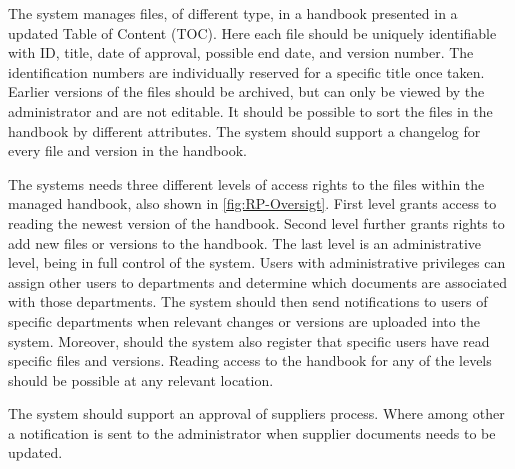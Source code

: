 The system manages files, of different type, in a handbook presented in a updated Table of Content (TOC).
Here each file should be uniquely identifiable with ID, title, date of approval, possible end date, and version number.
The identification numbers are individually reserved for a specific title once taken.
Earlier versions of the files should be archived, but can only be viewed by the administrator and are not editable.
It should be possible to sort the files in the handbook by different attributes.
The system should support a changelog for every file and version in the handbook.

The systems needs three different levels of access rights to the files within the managed handbook, also shown in \cref{fig:RP-Oversigt}.
First level grants access to reading the newest version of the handbook.
Second level further grants rights to add new files or versions to the handbook.
The last level is an administrative level, being in full control of the system.
Users with administrative privileges can assign other users to departments and determine which documents are associated with those departments.
The system should then send notifications to users of specific departments when relevant changes or versions are uploaded into the system.
Moreover, should the system also register that specific users have read specific files and versions.
Reading access to the handbook for any of the levels should be possible at any relevant location.

The system should support an approval of suppliers process.
Where among other a notification is sent to the administrator when supplier documents needs to be updated.

